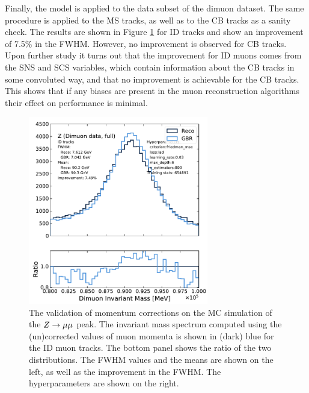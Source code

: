 Finally, the model is applied to the data subset of the dimuon dataset.
The same procedure is applied to the MS tracks, as well as to the CB
tracks as a sanity check. The results are shown in Figure
\ref{fig:muon:vader-dimuon} for ID tracks and show an improvement
of 7.5\% in the FWHM. However, no improvement is observed for CB tracks.
Upon further study it turns out that the improvement for ID muons comes
from the SNS and SCS variables, which contain information about the CB
tracks in some convoluted way, and that no improvement is achievable
for the CB tracks. This shows that if any biases are present in
the muon reconstruction algorithms their effect on performance is minimal.
\begin{figure}[h!]
  \centering
  \includegraphics[width=0.7\textwidth]{figures/muons/vader-dimuon-ID}
  \caption[VADER4$\mu$ correction on the dimuon dataset]
  {The validation of momentum corrections on the MC simulation of the $Z \rightarrow \mu\mu$
  peak. The invariant mass spectrum computed using the (un)corrected values
  of muon momenta is shown in (dark) blue for the ID muon tracks. The bottom
  panel shows the ratio of the two distributions. The FWHM values and the means
  are shown on the left, as well as the improvement in the FWHM.
  The hyperparameters are shown on the right.}
  \label{fig:muon:vader-dimuon}
\end{figure}


